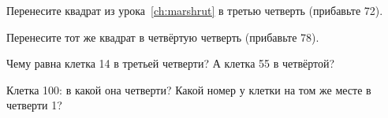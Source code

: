 \begin{probuy}
  \item Перенесите квадрат из урока~\ref{ch:marshrut} в третью четверть (прибавьте 72).
  \item Перенесите тот же квадрат в четвёртую четверть (прибавьте 78).
  \item Чему равна клетка 14 в третьей четверти? А клетка 55 в четвёртой?
  \item Клетка 100: в какой она четверти? Какой номер у клетки на том же месте в четверти 1?
\end{probuy}
